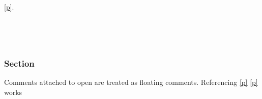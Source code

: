 \begin{ocamlindent}\hyperref[Toplevel_comments-Ref_in_synopsis-type-t]{[p\pageref*{Toplevel_comments-Ref_in_synopsis-type-t}]}.\end{ocamlindent}%
\medbreak
\label{Toplevel_comments-module-Comments_on_open}\begin{ocamlindent}\label{Toplevel_comments-Comments_on_open-module-M}\begin{ocamlindent}\label{Toplevel_comments-Comments_on_open-M-type-t}\\
\end{ocamlindent}%
\\
\subsubsection{Section\label{sec}}%
Comments attached to open are treated as floating comments. Referencing \hyperref[Toplevel_comments-Comments_on_open-sec]{[p\pageref*{Toplevel_comments-Comments_on_open-sec}]} \hyperref[Toplevel_comments-Comments_on_open-M-type-t]{[p\pageref*{Toplevel_comments-Comments_on_open-M-type-t}]} works

\end{ocamlindent}%
\\




